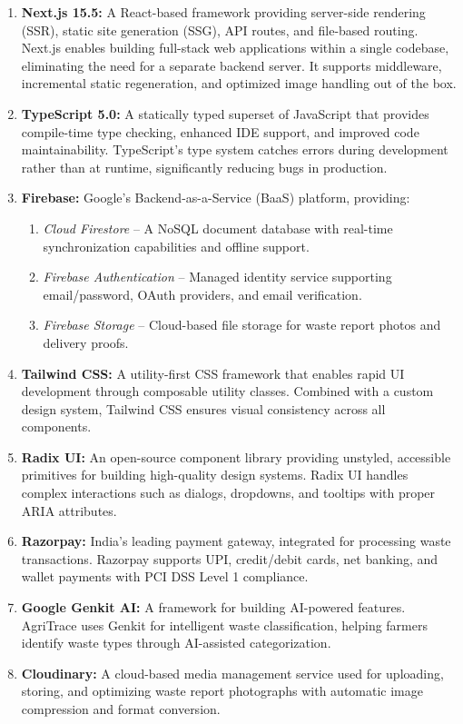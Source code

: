 \documentclass[a4paper,12pt,oneside]{report}
\let\originalitem\item
\renewcommand{\item}{\Needspace{10\baselineskip}\originalitem}
\begin{document}
\begin{enumerate}
    \item \textbf{Next.js 15.5:} A React-based framework providing server-side rendering (SSR), static site generation (SSG), API routes, and file-based routing. Next.js enables building full-stack web applications within a single codebase, eliminating the need for a separate backend server. It supports middleware, incremental static regeneration, and optimized image handling out of the box.

    \item \textbf{TypeScript 5.0:} A statically typed superset of JavaScript that provides compile-time type checking, enhanced IDE support, and improved code maintainability. TypeScript's type system catches errors during development rather than at runtime, significantly reducing bugs in production.

    \item \textbf{Firebase:} Google's Backend-as-a-Service (BaaS) platform, providing:
    \begin{enumerate}
        \item \textit{Cloud Firestore} -- A NoSQL document database with real-time synchronization capabilities and offline support.
        \item \textit{Firebase Authentication} -- Managed identity service supporting email/password, OAuth providers, and email verification.
        \item \textit{Firebase Storage} -- Cloud-based file storage for waste report photos and delivery proofs.
    \end{enumerate}

    \item \textbf{Tailwind CSS:} A utility-first CSS framework that enables rapid UI development through composable utility classes. Combined with a custom design system, Tailwind CSS ensures visual consistency across all components.

    \item \textbf{Radix UI:} An open-source component library providing unstyled, accessible primitives for building high-quality design systems. Radix UI handles complex interactions such as dialogs, dropdowns, and tooltips with proper ARIA attributes.

    \item \textbf{Razorpay:} India's leading payment gateway, integrated for processing waste transactions. Razorpay supports UPI, credit/debit cards, net banking, and wallet payments with PCI DSS Level 1 compliance.

    \item \textbf{Google Genkit AI:} A framework for building AI-powered features. AgriTrace uses Genkit for intelligent waste classification, helping farmers identify waste types through AI-assisted categorization.

    \item \textbf{Cloudinary:} A cloud-based media management service used for uploading, storing, and optimizing waste report photographs with automatic image compression and format conversion.
\end{enumerate}
\end{document}
